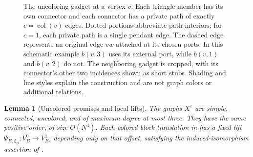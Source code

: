\documentclass[11pt]{article}
\newtheorem{lemma}[theorem]{Lemma}
\theoremstyle{definition}
\newcommand{\eps}{\varepsilon}
\begin{document}
\begin{figure}[tb]
\caption{The uncoloring gadget at a vertex \(v\).
Each triangle member has its own connector and each connector
has a private path of exactly \(c=\operatorname{col}(v)\) edges.
Dotted portions abbreviate path interiors; for \(c=1\), each private
path is a single pendant edge.
The dashed edge represents an original edge \(vw\) attached at its
chosen ports.  In this schematic example \(b(v,3)\) uses its external
port, while \(b(v,1)\) and \(b(v,2)\) do not.
The neighboring gadget is cropped, with its connector's other two
incidences shown as short stubs.
Shading and line styles explain the construction and are not graph
colors or additional relations.}
\label{graph:fig-uncoloring}
\end{figure}


\begin{lemma}[Uncolored promises and local lifts]
\label{graph:uncolored-lifts}
The graphs \(X^\eps\) are simple, connected, uncolored, and of maximum
degree at most three.  They have the same positive order, of size
\(O(N^4)\).
Each colored block translation in 
has a fixed lift \(\Psi_{B,\xi_B}:V_B^0\to V_B^1\), depending only
on that offset, satisfying the induced-isomorphism assertion of
.
\end{lemma}
\end{document}
